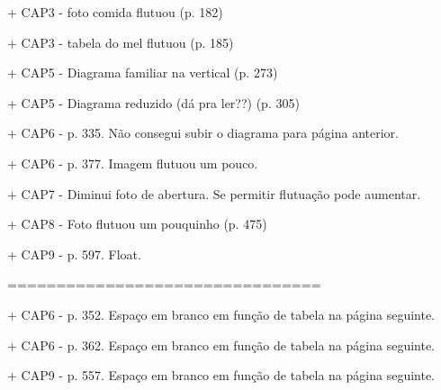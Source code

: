 + CAP3 - foto comida flutuou (p. 182)

+ CAP3 - tabela do mel flutuou (p. 185)

+ CAP5 - Diagrama familiar na vertical (p. 273)

+ CAP5 - Diagrama reduzido (dá pra ler??) (p. 305)

+ CAP6 - p. 335. Não consegui subir o diagrama para página anterior.

+ CAP6 - p. 377. Imagem flutuou um pouco.

+ CAP7 - Diminui foto de abertura. Se permitir flutuação pode aumentar.

+ CAP8 - Foto flutuou um pouquinho (p. 475)

+ CAP9 - p. 597. Float.

================================

+ CAP6 - p. 352. Espaço em branco em função de tabela na página seguinte.

+ CAP6 - p. 362. Espaço em branco em função de tabela na página seguinte.

+ CAP9 - p. 557. Espaço em branco em função de tabela na página seguinte.


